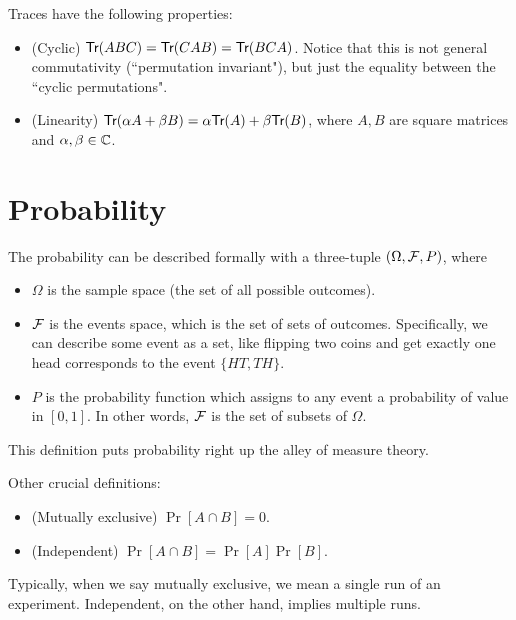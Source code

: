 \documentclass[12pt]{article}
\begin{document}
\begin{proposition}
Traces have the following properties:
\begin{itemize}
    \item (Cyclic) $\textsf{Tr}(ABC) = \textsf{Tr}(CAB) = \textsf{Tr}(BCA)$. Notice that this is not general commutativity (``permutation invariant"), but just the equality between the ``cyclic permutations".
    \item (Linearity) $\textsf{Tr}(\alpha A + \beta B) = \alpha\textsf{Tr}(A) + \beta \textsf{Tr}(B)$, where $A,B$ are square matrices and $\alpha, \beta\in {\mathbb C}$.
\end{itemize}
\end{proposition}

\section{Probability}
\begin{definition}
The probability can be described formally with a three-tuple $(\Omega, {\mathcal F}, P)$, where
\begin{itemize}
    \item $\Omega$ is the sample space (the set of all possible outcomes).
    \item ${\mathcal F}$ is the events space, which is the set of sets of outcomes. Specifically, we can describe some event as a set, like flipping two coins and get exactly one head corresponds to the event $\{HT, TH\}$.
    \item $P$ is the probability function which assigns to any event a probability of value in $[0,1]$. In other words, ${\mathcal F}$ is the set of subsets of $\Omega$.
\end{itemize}

This definition puts probability right up the alley of measure theory.
\end{definition}

\begin{definition}
Other crucial definitions:
\begin{itemize}
    \item (Mutually exclusive) $\Pr[A\cap B] = 0$.
    \item (Independent) $\Pr[A\cap B] = \Pr[A] \Pr[B]$.
\end{itemize}

Typically, when we say mutually exclusive, we mean a single run of an experiment. Independent, on the other hand, implies multiple runs.
\end{definition}
\end{document}
